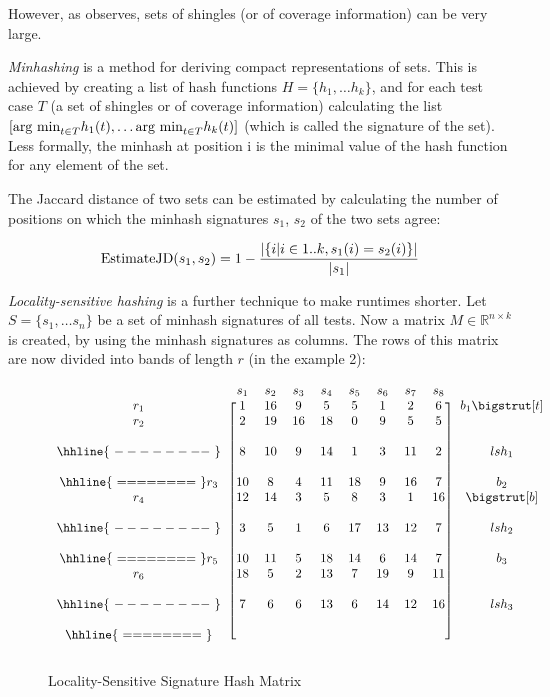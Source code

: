 However, as \cite{miranda2018fast} observes, sets of shingles (or of
coverage information) can be very large.

\textit{Minhashing} is a method for deriving compact representations of
sets. This is achieved by creating a list of hash functions $H=\{h_1,
\dots h_k\}$, and for each test case $T$ (a set of shingles or of
coverage information) calculating the list $[\hbox{arg min}_{t \in T}
h_1(t), \dots \hbox{arg min}_{t \in T} h_k(t)]$ (which is called the
signature of the set). Less formally, the minhash at position i is the
minimal value of the hash function for any element of the set.

The Jaccard distance of two sets can be estimated by calculating the
number of positions on which the minhash signatures $s_1$, $s_2$ of the
two sets agree:

$$\hbox{EstimateJD}(s_1,s_2)=1-\frac{|\{i|i\in 1..k, s_1(i)=s_2(i)\}|}{|s_1|}$$

\textit{Locality-sensitive hashing} is a further technique to make
runtimes shorter. Let $S=\{s_1, \dots s_n\}$ be a set of minhash
signatures of all tests. Now a matrix $M \in \mathbb{R}^{n \times k}$
is created, by using the minhash signatures as columns. The rows of this
matrix are now divided into bands of length $r$ (in the example 2):


\begin{figure}[!ht]
\[
\begin{blockarray}{cccccccccc}
	& s_1 & s_2 & s_3 & s_4 & s_5 & s_6 & s_7 & s_8 & \\
	\begin{block}{c[cccccccc]c}
		r_1 & 1 & 16 & 9 & 5 & 5 & 1 & 2 & 6 & b_1 \bigstrut[t] \\
		r_2 & 2 & 19 & 16 & 18 & 0 & 9 & 5 & 5 & \\
		\\\hhline{~--------~}
		& 8 & 10 & 9 & 14 & 1 & 3 & 11 & 2 & lsh_1 \\
		\\\hhline{~========~}
		r_3 & 10 & 8 & 4 & 11 & 18 & 9 & 16 & 7 & b_2 \\
		r_4 & 12 & 14 & 3 & 5 & 8 & 3 & 1 & 16 & \bigstrut[b]\\
		\\\hhline{~--------~}
		& 3 & 5 & 1 & 6 & 17 & 13 & 12 & 7 & lsh_2 \\
		\\\hhline{~========~}
		r_5 & 10 & 11 & 5 & 18 & 14 & 6 & 14 & 7 & b_3 \\
		r_6 & 18 & 5 & 2 & 13 & 7 & 19 & 9 & 11 & \\
		\\\hhline{~--------~}
		& 7 & 6 & 6 & 13 & 6 & 14 & 12 & 16 & lsh_3 \\
		\\\hhline{~========~} \\
	\end{block}
\end{blockarray}\vspace*{-1.25\baselineskip}
\]
\caption{Locality-Sensitive Signature Hash Matrix}\label{tab:lsh_matrix}
\end{figure}


